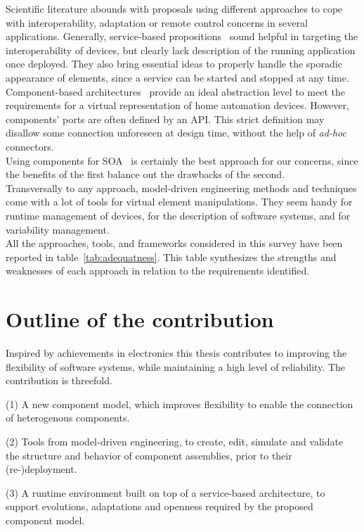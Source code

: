 Scientific literature abounds with proposals using different approaches to cope with interoperability, adaptation or remote control concerns in several applications. Generally, service-based propositions~\cite{OSGI:r4,ESB} sound helpful in targeting the interoperability of devices, but clearly lack description of the running application once deployed. They also bring essential ideas to properly handle the sporadic appearance of elements, since a service can be started and stopped at any time.\\
Component-based architectures~\cite{Georgiadis:2002,RobVanOmmering:2000,Bruneton:2006} provide an ideal abstraction level to meet the requirements for a virtual representation of home automation devices. However, components' ports are often defined by an API. This strict definition may disallow some connection unforeseen at design time, without the help of {\it ad-hoc} connectors.\\
Using components for SOA~\cite{sca:specs,Melisson:2010,Escoffier:2007} is certainly the best approach for our concerns, since the benefits of the first balance out the drawbacks of the second.\\
Transversally to any approach, model-driven engineering methods and techniques come with a lot of tools for virtual element manipulations. They seem handy for runtime management of devices, for the description of software systems, and for variability management.\\

All the approaches, tools, and frameworks considered in this survey have been reported in table~\ref{tab:adequatness}. This table synthesizes the strengths and weaknesses of each approach in relation to the requirements identified.






\section{Outline of the contribution}


Inspired by achievements in electronics this thesis contributes to improving the flexibility of software systems, while maintaining a high level of reliability. The contribution is threefold.
\par (1) A new component model, which improves flexibility to enable the connection of heterogenous components.
\par (2) Tools from model-driven engineering, to create, edit, simulate and validate the structure and behavior of component assemblies, prior to their (re-)deployment. 
\par (3) A runtime environment built on top of a service-based architecture, to support evolutions, adaptations and openness required by the proposed component model.\\

